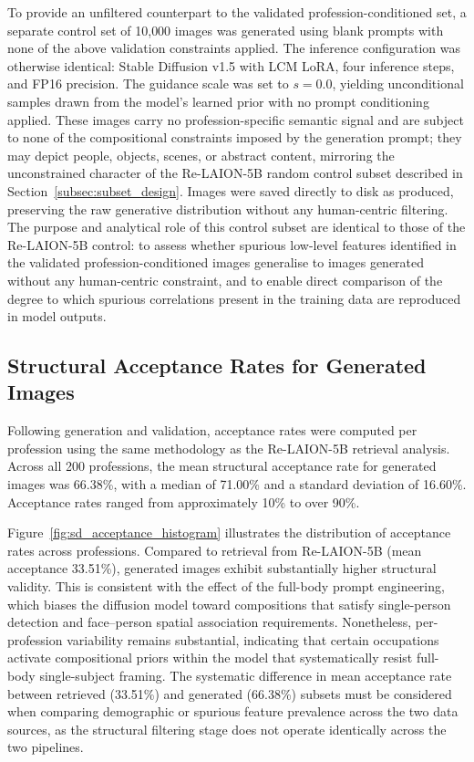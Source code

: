 To provide an unfiltered counterpart to the validated profession-conditioned
set, a separate control set of 10{,}000 images was generated using blank
prompts with none of the above validation constraints applied. The inference
configuration was otherwise identical: Stable Diffusion v1.5 with LCM
LoRA, four inference steps, and FP16 precision. The guidance scale was set
to $s = 0.0$, yielding unconditional samples drawn from the model's learned
prior with no prompt conditioning applied. These images carry no
profession-specific semantic signal and are subject to none of the
compositional constraints imposed by the generation prompt; they may depict
people, objects, scenes, or abstract content, mirroring the unconstrained
character of the Re-LAION-5B random control subset described in
Section~\ref{subsec:subset_design}. Images were saved directly to disk as
produced, preserving the raw generative distribution without any
human-centric filtering. The purpose and analytical role of this control
subset are identical to those of the Re-LAION-5B control: to assess whether
spurious low-level features identified in the validated
profession-conditioned images generalise to images generated without any
human-centric constraint, and to enable direct comparison of the degree to
which spurious correlations present in the training data are reproduced in
model outputs.

\subsection{Structural Acceptance Rates for Generated Images}

Following generation and validation, acceptance rates were computed per
profession using the same methodology as the Re-LAION-5B retrieval
analysis. Across all 200 professions, the mean structural acceptance rate
for generated images was 66.38\%, with a median of 71.00\% and a standard
deviation of 16.60\%. Acceptance rates ranged from approximately 10\% to
over 90\%.

Figure~\ref{fig:sd_acceptance_histogram} illustrates the distribution of
acceptance rates across professions. Compared to retrieval from Re-LAION-5B
(mean acceptance 33.51\%), generated images exhibit substantially higher
structural validity. This is consistent with the effect of the full-body
prompt engineering, which biases the diffusion model toward compositions
that satisfy single-person detection and face--person spatial association
requirements. Nonetheless, per-profession variability remains substantial,
indicating that certain occupations activate compositional priors within
the model that systematically resist full-body single-subject framing. The
systematic difference in mean acceptance rate between retrieved (33.51\%)
and generated (66.38\%) subsets must be considered when comparing
demographic or spurious feature prevalence across the two data sources, as
the structural filtering stage does not operate identically across the two
pipelines.

